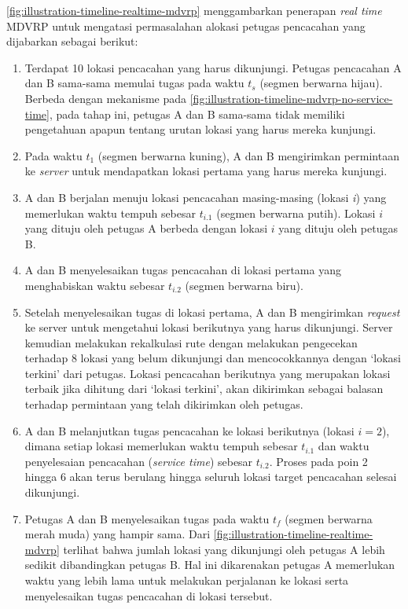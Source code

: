 \autoref{fig:illustration-timeline-realtime-mdvrp} menggambarkan penerapan \textit{real time} MDVRP untuk mengatasi permasalahan alokasi petugas pencacahan yang dijabarkan sebagai berikut:
\begin{enumerate}
	\item Terdapat 10 lokasi pencacahan yang harus dikunjungi. Petugas pencacahan A dan B sama-sama memulai tugas pada waktu $t_{s}$ (segmen berwarna hijau). Berbeda dengan mekanisme pada \autoref{fig:illustration-timeline-mdvrp-no-service-time}, pada tahap ini, petugas A dan B sama-sama tidak memiliki pengetahuan apapun tentang urutan lokasi yang harus mereka kunjungi. 
	\item Pada waktu $t_{1}$ (segmen berwarna kuning), A dan B mengirimkan permintaan ke \textit{server} untuk mendapatkan lokasi pertama yang harus mereka kunjungi. 
	\item A dan B berjalan menuju lokasi pencacahan masing-masing (lokasi \textit{i}) yang memerlukan waktu tempuh sebesar $t_{i.1}$ (segmen berwarna putih). Lokasi $i$ yang dituju oleh petugas A berbeda dengan lokasi $i$ yang dituju oleh petugas B.
	\item A dan B menyelesaikan tugas pencacahan di lokasi pertama yang menghabiskan waktu sebesar $t_{i.2}$ (segmen berwarna biru).
	\item Setelah menyelesaikan tugas di lokasi pertama, A dan B mengirimkan \textit{request} ke server untuk mengetahui lokasi berikutnya yang harus dikunjungi. Server kemudian melakukan rekalkulasi rute dengan melakukan pengecekan terhadap 8 lokasi yang belum dikunjungi dan mencocokkannya dengan `lokasi terkini' dari petugas. Lokasi pencacahan berikutnya yang merupakan lokasi terbaik jika dihitung dari `lokasi terkini', akan dikirimkan sebagai balasan terhadap permintaan yang telah dikirimkan oleh petugas. 
	\item A dan B melanjutkan tugas pencacahan ke lokasi berikutnya (lokasi $i = 2$), dimana setiap lokasi memerlukan waktu tempuh sebesar $t_{i.1}$ dan waktu penyelesaian pencacahan (\textit{service time}) sebesar $t_{i.2}$. Proses pada poin 2 hingga 6 akan terus berulang hingga seluruh lokasi target pencacahan selesai dikunjungi. 
	\item Petugas A dan B menyelesaikan tugas pada waktu $t_{f}$ (segmen berwarna merah muda) yang hampir sama. Dari \autoref{fig:illustration-timeline-realtime-mdvrp} terlihat bahwa jumlah lokasi yang dikunjungi oleh petugas A lebih sedikit dibandingkan petugas B. Hal ini dikarenakan petugas A memerlukan waktu yang lebih lama untuk melakukan perjalanan ke lokasi serta menyelesaikan tugas pencacahan di lokasi tersebut. 
\end{enumerate}


